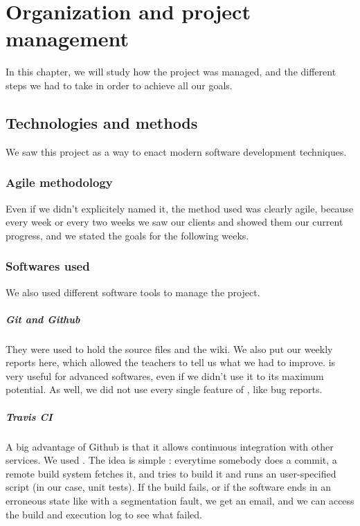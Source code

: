 \chapter{Organization and project management}
In this chapter, we will study how the project was managed, and the different steps we had to take in order to achieve all our goals.

\section{Technologies and methods}
We saw this project as a way to enact modern software development techniques.
\subsection{Agile methodology}
Even if we didn't explicitely named it, the method used was clearly agile, because every week or every two weeks we saw our clients and showed them our current progress, and we stated the goals for the following weeks.

\subsection{Softwares used}
We also used different software tools to manage the project.

\paragraph{Git and Github} 
They were used to hold the source files and the wiki. We also put our weekly reports here, which allowed the teachers to tell us what we had to improve.  is very useful for advanced softwares, even if we didn't use it to its maximum potential.
As well, we did not use every single feature of , like bug reports.

\paragraph{Travis CI} 
A big advantage of Github is that it allows continuous integration with other services. We used . The idea is simple : everytime somebody does a commit, a remote build system fetches it, and tries to build it and runs an user-specified script (in our case, unit tests). If the build fails, or if the software ends in an erroneous state like with a segmentation fault, we get an email, and we can access the build and execution log to see what failed.

